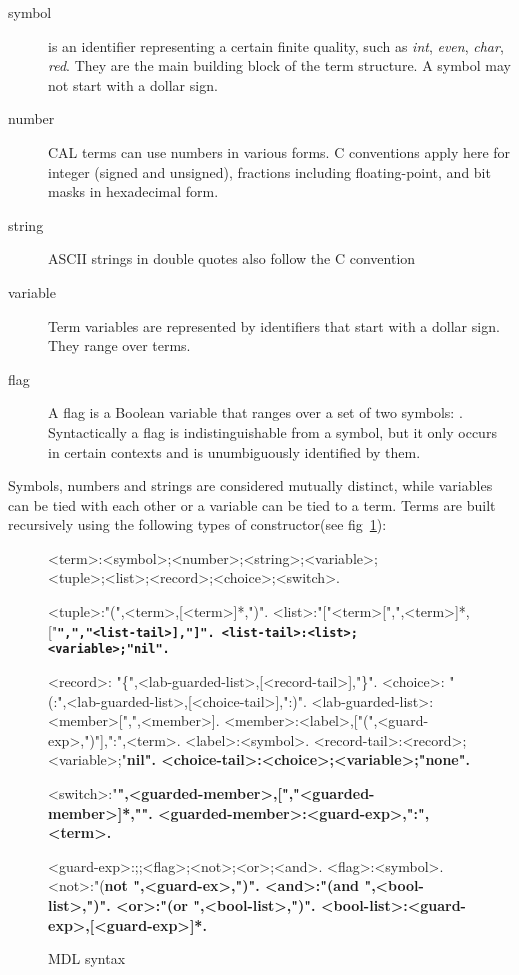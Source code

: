 \documentclass[11pt]{report}
\newcommand\la{\bf\textlangle\xspace}  \newcommand\ra{\bf\textrangle\xspace}
\begin{document}
\begin{description}
\item[symbol] is an identifier representing a certain finite quality, such as {\em int}, {\em even}, {\em char}, {\em red}. They are the main building block of the term structure. A symbol may not start with a dollar sign.
\item[number] CAL terms can use numbers in various forms. C conventions apply here for integer (signed and unsigned), fractions including floating-point, and bit masks in hexadecimal form.
\item[string] ASCII strings in double quotes also follow the C convention
\item[variable] Term variables are represented by identifiers that start with a dollar sign. They range over terms.
\item[flag]	A flag is a Boolean variable that ranges over a set of two symbols: . Syntactically a flag is indistinguishable from a symbol, but it only occurs in certain contexts and is unumbiguously identified by them.
\end{description}

Symbols, numbers and strings are considered mutually distinct, while variables can be tied with each other or a variable can be tied to a term. Terms are built recursively using the following types of constructor(see fig~\ref{fig:mdl}):
\def\dbbr{\tt\bf\textbar\kern-1pt\textbar}
\begin{figure}[htb]
\begin{framed}
\small
\begin{grammar}
[(colon){}]
[(semicolon)]
[(comma){}]
[(period){\\}]
[(quote){\begin{bf}}{\end{bf}}]
[(nonterminal){}{}]

<term>:<symbol>;<number>;<string>;<variable>;\\
<tuple>;<list>;<record>;<choice>;<switch>.

<tuple>:"(",<term>,[<term>]*,")".
<list>:"["<term>[",",<term>]*,["\dbbr",","<list-tail>],"]".
<list-tail>:<list>;<variable>;"\bf nil".

<record>: "\{",<lab-guarded-list>,[<record-tail>],"\}".
<choice>:  "(:",<lab-guarded-list>,[<choice-tail>],":)".
<lab-guarded-list>:<member>[",",<member>].
<member>:<label>,["(",<guard-exp>,")"],":",<term>.
<label>:<symbol>.
<record-tail>:<record>;<variable>;"\bf nil".
<choice-tail>:<choice>;<variable>;"\bf none".

<switch>:"\la",<guarded-member>,[","<guarded-member>]*,"\ra".
<guarded-member>:<guard-exp>,":",<term>.

<guard-exp>:\true;\false;<flag>;<not>;<or>;<and>.
<flag>:<symbol>.
<not>:"(\bf not ",<guard-ex>,")".
<and>:"(\bf and ",<bool-list>,")".
<or>:"(\bf or ",<bool-list>,")".
<bool-list>:<guard-exp>,[<guard-exp>]*.
\end{grammar}
\end{framed}
\caption{MDL syntax\label{fig:mdl}}
\end{figure}
\end{document}
